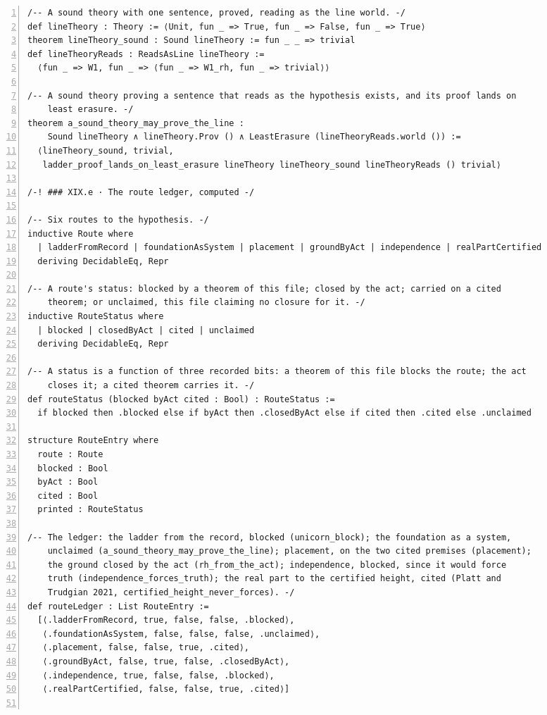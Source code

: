 \documentclass[10pt]{article}
\newcommand{\leansize}{\fontsize{5.5pt}{6.75pt}\selectfont}
\begin{document}
\begin{multicols}{2}
\begin{Verbatim}[numbers=left,firstnumber=1,numbersep=3pt,xleftmargin=2.6em,breaklines=true,breakanywhere=true,breakautoindent=false,breakindent=1.4em,breaksymbolleft={},breakanywheresymbolpre={},fontsize=\leansize]
/-- A sound theory with one sentence, proved, reading as the line world. -/
def lineTheory : Theory := ⟨Unit, fun _ => True, fun _ => False, fun _ => True⟩
theorem lineTheory_sound : Sound lineTheory := fun _ _ => trivial
def lineTheoryReads : ReadsAsLine lineTheory :=
  ⟨fun _ => W1, fun _ => ⟨fun _ => W1_rh, fun _ => trivial⟩⟩

/-- A sound theory proving a sentence that reads as the hypothesis exists, and its proof lands on
    least erasure. -/
theorem a_sound_theory_may_prove_the_line :
    Sound lineTheory ∧ lineTheory.Prov () ∧ LeastErasure (lineTheoryReads.world ()) :=
  ⟨lineTheory_sound, trivial,
   ladder_proof_lands_on_least_erasure lineTheory lineTheory_sound lineTheoryReads () trivial⟩

/-! ### XIX.e · The route ledger, computed -/

/-- Six routes to the hypothesis. -/
inductive Route where
  | ladderFromRecord | foundationAsSystem | placement | groundByAct | independence | realPartCertified
  deriving DecidableEq, Repr

/-- A route's status: blocked by a theorem of this file; closed by the act; carried on a cited
    theorem; or unclaimed, this file claiming no closure for it. -/
inductive RouteStatus where
  | blocked | closedByAct | cited | unclaimed
  deriving DecidableEq, Repr

/-- A status is a function of three recorded bits: a theorem of this file blocks the route; the act
    closes it; a cited theorem carries it. -/
def routeStatus (blocked byAct cited : Bool) : RouteStatus :=
  if blocked then .blocked else if byAct then .closedByAct else if cited then .cited else .unclaimed

structure RouteEntry where
  route : Route
  blocked : Bool
  byAct : Bool
  cited : Bool
  printed : RouteStatus

/-- The ledger: the ladder from the record, blocked (unicorn_block); the foundation as a system,
    unclaimed (a_sound_theory_may_prove_the_line); placement, on the two cited premises (placement);
    the ground closed by the act (rh_from_the_act); independence, blocked, since it would force
    truth (independence_forces_truth); the real part to the certified height, cited (Platt and
    Trudgian 2021, certified_height_never_forces). -/
def routeLedger : List RouteEntry :=
  [⟨.ladderFromRecord, true, false, false, .blocked⟩,
   ⟨.foundationAsSystem, false, false, false, .unclaimed⟩,
   ⟨.placement, false, false, true, .cited⟩,
   ⟨.groundByAct, false, true, false, .closedByAct⟩,
   ⟨.independence, true, false, false, .blocked⟩,
   ⟨.realPartCertified, false, false, true, .cited⟩]


\end{Verbatim}
\end{multicols}
\end{document}
